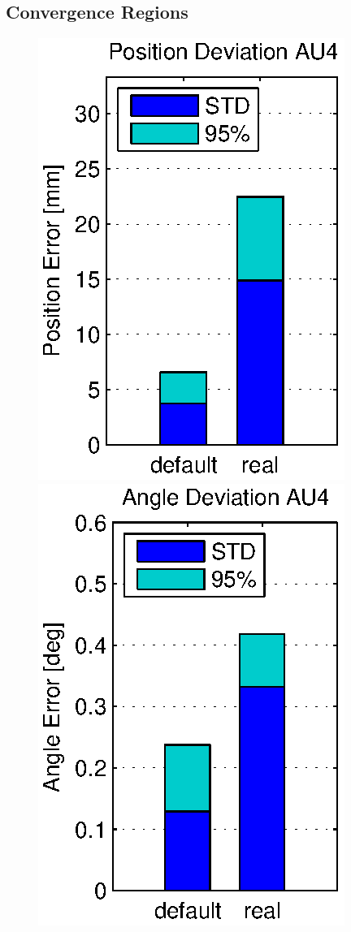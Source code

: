 \subsection{Convergence Regions}

\begin{figure}[hbtp]
\centering
\includegraphics[scale=.72]{images/results/err_cmp_real_pos.eps}
\includegraphics[scale=.72]{images/results/err_cmp_real_angle.eps}\\

\end{figure}
